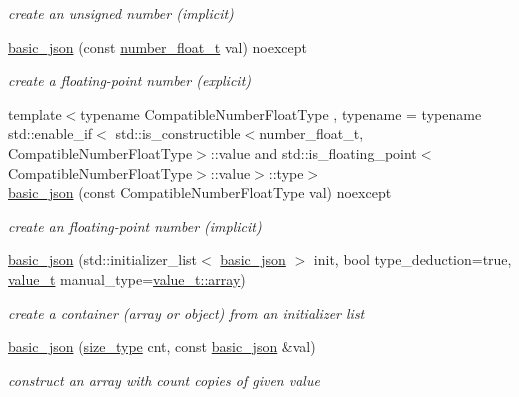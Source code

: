 \begin{DoxyCompactItemize}
\begin{DoxyCompactList}\small\item\em create an unsigned number (implicit) \end{DoxyCompactList}\item 
\hyperlink{classnlohmann_1_1basic__json_a2badcf191deabf579abcf8d3654da26f}{basic\+\_\+json} (const \hyperlink{classnlohmann_1_1basic__json_a74a0013e847fdc574b48f931f0e757e1}{number\+\_\+float\+\_\+t} val) noexcept
\begin{DoxyCompactList}\small\item\em create a floating-\/point number (explicit) \end{DoxyCompactList}\item 
{\footnotesize template$<$typename Compatible\+Number\+Float\+Type , typename  = typename std\+::enable\+\_\+if$<$                 std\+::is\+\_\+constructible$<$number\+\_\+float\+\_\+t, Compatible\+Number\+Float\+Type$>$\+::value and                 std\+::is\+\_\+floating\+\_\+point$<$\+Compatible\+Number\+Float\+Type$>$\+::value$>$\+::type$>$ }\\\hyperlink{classnlohmann_1_1basic__json_a4bbdfd6dd8d2e6fc9ac5d81ef61ba3fe}{basic\+\_\+json} (const Compatible\+Number\+Float\+Type val) noexcept
\begin{DoxyCompactList}\small\item\em create an floating-\/point number (implicit) \end{DoxyCompactList}\item 
\hyperlink{classnlohmann_1_1basic__json_afeb998aec45296bc2050bd1c41ef41eb}{basic\+\_\+json} (std\+::initializer\+\_\+list$<$ \hyperlink{classnlohmann_1_1basic__json}{basic\+\_\+json} $>$ init, bool type\+\_\+deduction=true, \hyperlink{classnlohmann_1_1basic__json_a231b02148577b69a154b2ce2c87a5522}{value\+\_\+t} manual\+\_\+type=\hyperlink{classnlohmann_1_1basic__json_a231b02148577b69a154b2ce2c87a5522af1f713c9e000f5d3f280adbd124df4f5}{value\+\_\+t\+::array})
\begin{DoxyCompactList}\small\item\em create a container (array or object) from an initializer list \end{DoxyCompactList}\item 
\hyperlink{classnlohmann_1_1basic__json_a112a2d8e76345ea64f71e2985fee4c52}{basic\+\_\+json} (\hyperlink{classnlohmann_1_1basic__json_a1579a8f72a230358d6cd1a6e8a62859b}{size\+\_\+type} cnt, const \hyperlink{classnlohmann_1_1basic__json}{basic\+\_\+json} \&val)
\begin{DoxyCompactList}\small\item\em construct an array with count copies of given value \end{DoxyCompactList}\item 

\end{DoxyCompactItemize}
